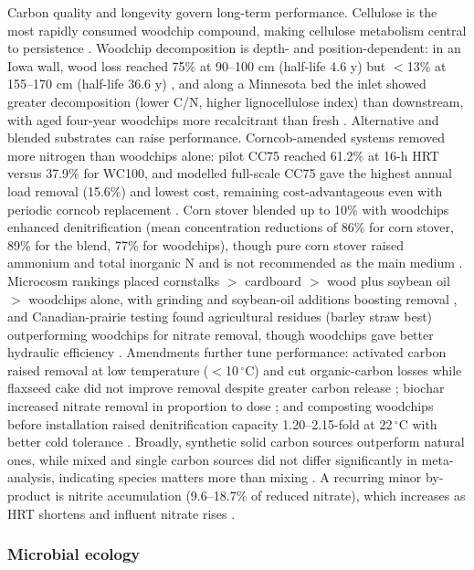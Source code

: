 \documentclass[11pt]{article}
\begin{document}
Carbon quality and longevity govern long-term performance. Cellulose is the most rapidly consumed woodchip compound, making cellulose metabolism central to persistence \parencite{Hartfiel2022}. Woodchip decomposition is depth- and position-dependent: in an Iowa wall, wood loss reached 75\% at 90--100 cm (half-life 4.6 y) but $<$13\% at 155--170 cm (half-life 36.6 y) \parencite{Moorman2010}, and along a Minnesota bed the inlet showed greater decomposition (lower C/N, higher lignocellulose index) than downstream, with aged four-year woodchips more recalcitrant than fresh \parencite{Ghane2018}. Alternative and blended substrates can raise performance. Corncob-amended systems removed more nitrogen than woodchips alone: pilot CC75 reached 61.2\% at 16-h HRT versus 37.9\% for WC100, and modelled full-scale CC75 gave the highest annual load removal (15.6\%) and lowest cost, remaining cost-advantageous even with periodic corncob replacement \parencite{Law2023}. Corn stover blended up to 10\% with woodchips enhanced denitrification (mean concentration reductions of 86\% for corn stover, 89\% for the blend, 77\% for woodchips), though pure corn stover raised ammonium and total inorganic N and is not recommended as the main medium \parencite{Oladeji2023}. Microcosm rankings placed cornstalks $>$ cardboard $>$ wood plus soybean oil $>$ woodchips alone, with grinding and soybean-oil additions boosting removal \parencite{Greenan2006}, and Canadian-prairie testing found agricultural residues (barley straw best) outperforming woodchips for nitrate removal, though woodchips gave better hydraulic efficiency \parencite{Kohn2023}. Amendments further tune performance: activated carbon raised removal at low temperature ($<$10\,$^{\circ}$C) and cut organic-carbon losses while flaxseed cake did not improve removal despite greater carbon release \parencite{Povilaitis2020}; biochar increased nitrate removal in proportion to dose \parencite{Ahmadvand2020}; and composting woodchips before installation raised denitrification capacity 1.20--2.15-fold at 22\,$^{\circ}$C with better cold tolerance \parencite{Kouanda2021}. Broadly, synthetic solid carbon sources outperform natural ones, while mixed and single carbon sources did not differ significantly in meta-analysis, indicating species matters more than mixing \parencite{Zhang2021b}. A recurring minor by-product is nitrite accumulation (9.6--18.7\% of reduced nitrate), which increases as HRT shortens and influent nitrate rises \parencite{Hua2016,Kouanda2021}.

\subsubsection{Microbial ecology}
\end{document}
